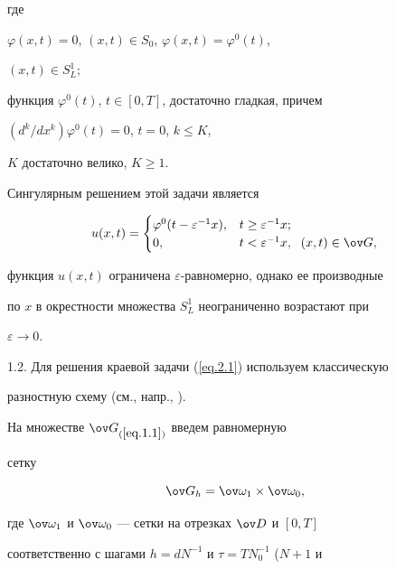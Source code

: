 где 


$\varphi(x, t)=0$, $(x, t)\in S_0$, $\varphi(x, t)=\varphi^0(t)$,


$(x, t)\in S^1_L$; 


функция $\varphi^0(t)$, $t\in [0, T]$, достаточно гладкая, причем


$(d^k/d x^k)\varphi^0(t)=0$, $t=0$, $k\le K$,


$K$ достаточно велико, $K\ge 1$.





Сингулярным решением этой задачи является 


\begin{equation}


\label{eq.2.2}


u(x, t)=


\begin{cases}


\varphi^0 (t-\varepsilon^{-1} x), & t\ge \varepsilon^{-1} x;\\


0, & t< \varepsilon^{-1} x, \ \; (x, t)\in \ov G,


\end{cases}


\end{equation}


функция $u(x, t)$ ограничена $\varepsilon$-равномерно, однако ее производные


по $x$ в окрестности множества $S^1_L$ неограниченно возрастают при


$\varepsilon\to 0$.





1.2. Для решения краевой задачи (\ref{eq.2.1}) используем классическую


разностную схему (см., напр., \cite{2}).


На множестве $\ov G_{(\ref{eq.1.1})}$ введем равномерную


сетку 


\begin{equation} \label{eq.2.3}


\ov G_h=\ov\omega_1\times \ov\omega_0,


\end{equation}


где $\ov\omega_1$ и $\ov\omega_0$ --- сетки на отрезках $\ov D$ и $[0, T]$


соответственно с шагами $h=d N^{-1}$ и $\tau=T N_0^{-1}$ ($N+1$ и


